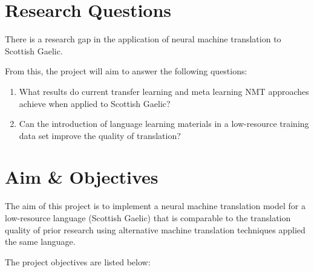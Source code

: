 
\section{Research Questions}
There is a research gap in the application of neural machine translation to Scottish Gaelic.

From this, the project will aim to answer the following questions:

\begin{enumerate}
    \item What results do current transfer learning and meta learning \acrshort{NMT} approaches achieve when applied to Scottish Gaelic?
    \item Can the introduction of language learning materials in a low-resource training data set improve the quality of translation?
\end{enumerate}
\section{Aim \& Objectives}
The aim of this project is to implement a neural machine translation model for a low-resource language (Scottish Gaelic) that is comparable to the translation quality of prior research using alternative machine translation techniques applied the same language.

The project objectives are listed below:

